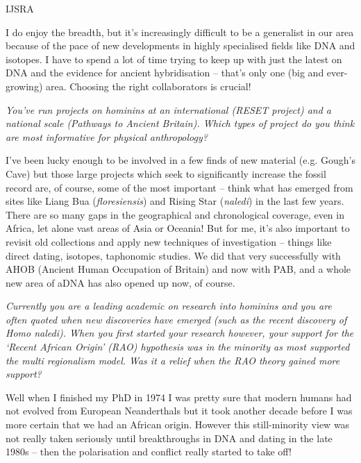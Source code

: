 \documentclass{ijsra}
\begin{document}
\begin{labeling}{IJSRA}
\item[CS]
I do enjoy the breadth, but it’s increasingly difficult to be a generalist in our area because of
the pace of new developments in highly specialised fields like DNA and isotopes.
I have to spend a lot of time trying to keep up with just the latest on DNA and the evidence for ancient hybridisation – that’s only one (big and ever-growing) area. Choosing the right collaborators is crucial!

\item[IJSRA]
\emph{You’ve run projects on hominins at an international (RESET project) and a national scale (Pathways to Ancient Britain).
Which types of project do you think are most informative for physical anthropology?}

\item[CS]
I’ve been lucky enough to be involved in a few finds of new material (e.g. Gough’s Cave) but
those large projects which seek to significantly increase the fossil record are, of course,
some of the most important – think what has emerged from sites like Liang Bua (\emph{floresiensis}) and Rising Star (\emph{naledi})
in the last few years. 
There are so many gaps in the geographical and chronological coverage, even in Africa, let alone vast areas of Asia or Oceania!
But for me, it’s also important to revisit old collections and apply new techniques of investigation – things like direct dating,
isotopes, taphonomic studies. 
We did that very successfully with AHOB (Ancient Human Occupation of Britain) and now with PAB,
and a whole new area of aDNA has also opened up now, of course.

\item[IJSRA]
\emph{Currently you are a leading academic on research into hominins and you are often quoted when new discoveries
have emerged (such as the recent discovery of \textup{Homo naledi}). When you first started your research however,
your support for the ‘Recent African Origin’ (RAO) hypothesis was in the minority as most supported the multi regionalism model.
Was it a relief when the RAO theory gained more support?}

\item[CS]
Well when I finished my PhD in 1974 I was pretty sure that modern humans had not evolved from European Neanderthals but
it took another decade before I was more certain that we had an African origin.
However this still-minority view was not really taken seriously until breakthroughs in DNA and dating in the late
1980s – then the polarisation and conflict really started to take off!


\end{labeling}
\end{document}
